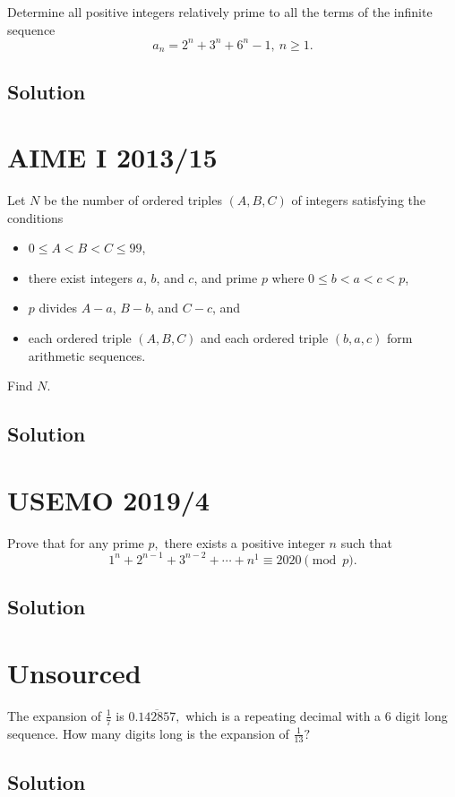 \documentclass[mast]{lucky}
\begin{document}
Determine all positive integers relatively prime to all the terms of the infinite sequence
\[a_n=2^n+3^n+6^n -1,\ n\geq 1.\]

\subsection{Solution}

\pagebreak\section{AIME I 2013/15}

Let $N$ be the number of ordered triples $(A,B,C)$ of integers satisfying the conditions
\begin{itemize}
\item $0\le A<B<C\le99$,
\item there exist integers $a$, $b$, and $c$, and prime $p$ where $0\le b<a<c<p$,
\item $p$ divides $A-a$, $B-b$, and $C-c$, and
\item each ordered triple $(A,B,C)$ and each ordered triple $(b,a,c)$ form arithmetic sequences.
\end{itemize}
Find $N$.

\subsection{Solution}

\pagebreak\section{USEMO 2019/4}

Prove that for any prime $p,$ there exists a positive integer $n$ such that
\[1^n+2^{n-1}+3^{n-2}+\cdots+n^1\equiv 2020\pmod{p}.\]

\subsection{Solution}

\pagebreak\section{Unsourced}

The expansion of $\frac{1}{7}$ is $0.\overline{142857},$ which is a repeating decimal with a $6$ digit long sequence. How many digits long is the expansion of $\frac{1}{13}?$

\subsection{Solution}
\end{document}
